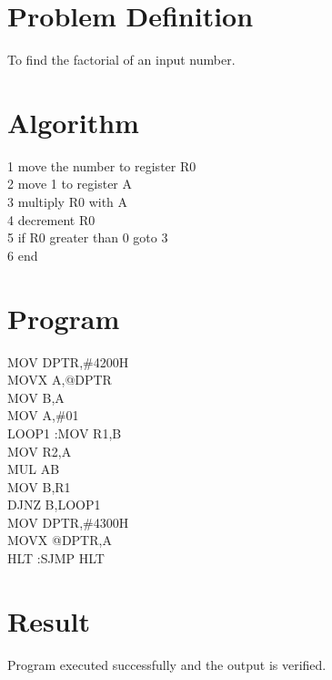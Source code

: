 \documentclass{article}
\begin{document}
\section{Problem Definition}
To find the factorial of an input number.
\section{Algorithm}
1 move the number to register R0\\
2 move 1 to register A\\
3 multiply R0 with A\\
4 decrement R0\\
5 if R0 greater than 0 goto 3\\
6 end\\
\section{Program}
MOV DPTR,\#4200H\\
MOVX A,@DPTR\\
MOV B,A\\
MOV A,\#01\\
LOOP1 :MOV R1,B\\
MOV R2,A\\
MUL AB\\
MOV B,R1\\
DJNZ B,LOOP1\\
MOV DPTR,\#4300H\\
MOVX @DPTR,A\\
HLT :SJMP HLT\\
\section{Result}
Program executed successfully and the output is verified.
\end{document}
